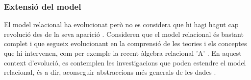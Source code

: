 




\subsubsection{Extensió del model}

El model relacional ha evolucionat però no es considera que hi hagi hagut
cap revolució des de la seva aparició
\parencite[cap.~19]{date06}. %
Consideren que el model relacional és bastant complet i que segueix
evolucionant en la comprensió de les teories i els conceptes que hi
intervenen, com per exemple la recent àlgebra relacional
'A' \parencite[ap.~A]{date06:_datab_types_relat_model}.  En aquest
context d'evolució, es contemplen les investigacions que poden
estendre el model relacional, és a dir, aconseguir abstraccions més
generals de les dades \parencite[cap.~25]{date06}. %

